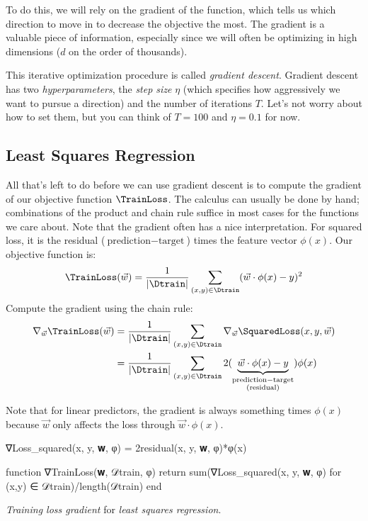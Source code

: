 To do this, we will rely on the gradient of the function, which tells us which direction to move in to decrease the objective the most.
The gradient is a valuable piece of information, especially since we will often be optimizing in high dimensions ($d$ on the order of thousands).

This iterative optimization procedure is called \textit{gradient descent}.
Gradient descent has two \textit{hyperparameters}, the \textit{step size} $\eta$ (which specifies how aggressively we want to pursue a direction) and the number of iterations $T$.
Let's not worry about how to set them, but you can think of $T = 100$ and $\eta = 0.1$ for now.



\subsection{Least Squares Regression} %
\label{sub:least_squares_regression}

All that's left to do before we can use gradient descent is to compute the gradient of our objective function $\TrainLoss$.
The calculus can usually be done by hand; combinations of the product and chain rule suffice in most cases for the functions we care about.
% 
Note that the gradient often has a nice interpretation.
For squared loss, it is the residual ($\text{prediction} - \text{target}$) times the feature vector $\phi(x)$.
Our objective function is:
\[
  \displaystyle \TrainLoss(\vec{w}) = \frac{1}{|\Dtrain|} \sum_{(x,y) \in \Dtrain} (\vec{w} \cdot \phi(x) - y)^2
\]
Compute the gradient using the chain rule:
\begin{align*}
\displaystyle \nabla_{\vec{w}} \TrainLoss(\vec{w}) &= \frac{1}{|\Dtrain|} \sum_{(x,y) \in \Dtrain} \nabla_{\vec{w}}\SquaredLoss(x, y, \vec{w})\\
                                                   &= \frac{1}{|\Dtrain|} \sum_{(x,y) \in \Dtrain} 2 (\underbrace{\vec{w} \cdot \phi(x) - y}_{\substack{\text{prediction} - \text{target} \\ \text{(residual)}}}) \phi(x)
\end{align*}

Note that for linear predictors, the gradient is always something times $\phi(x)$ because $\vec{w}$ only affects the loss through $\vec{w} \cdot \phi(x)$.
\begin{algorithm}
\begin{juliaverbatim}
∇Loss_squared(x, y, 𝐰, φ) = 2residual(x, y, 𝐰, φ)*φ(x)

function ∇TrainLoss(𝐰, 𝒟train, φ)
    return sum(∇Loss_squared(x, y, 𝐰, φ)
        for (x,y) ∈ 𝒟train)/length(𝒟train)
end
\end{juliaverbatim}

\caption{
    \label{alg:gradient_trainloss}
    \textit{Training loss gradient} for \textit{least squares regression}.
}
\end{algorithm}

